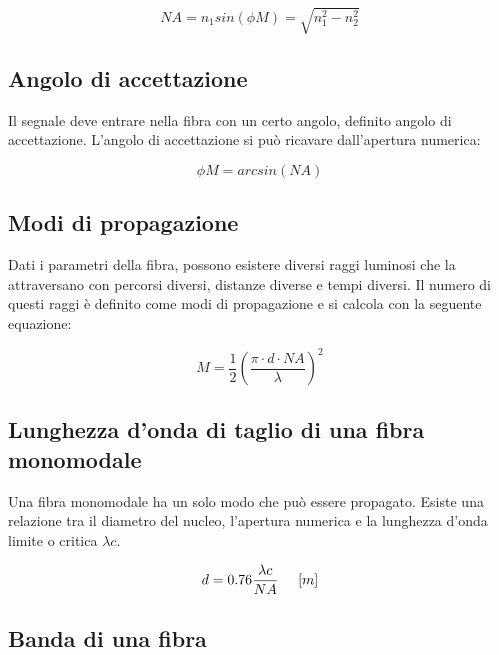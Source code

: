 \documentclass{article}
\begin{document}
    \begin{equation}
        NA = n_1 sin(\phi M) = \sqrt{n_1^2 - n_2^2}
    \end{equation}

    \subsection{Angolo di accettazione}

    Il segnale deve entrare nella fibra con un certo angolo, definito angolo di accettazione. L'angolo di accettazione si
    può ricavare dall'apertura numerica:

    \begin{equation}
        \phi M = arcsin(NA)
    \end{equation}

    \subsection{Modi di propagazione}

    Dati i parametri della fibra, possono esistere diversi raggi luminosi che la attraversano con percorsi diversi, distanze diverse
    e tempi diversi. Il numero di questi raggi è definito come modi di propagazione e si calcola con la seguente equazione:

    \begin{equation}
        M = \frac{1}{2} (\frac{\pi \cdot d \cdot NA}{\lambda})^2
    \end{equation}

    \subsection{Lunghezza d'onda di taglio di una fibra monomodale}

    Una fibra monomodale ha un solo modo che può essere propagato. Esiste una relazione tra il diametro del nucleo, l'apertura
    numerica e la lunghezza d'onda limite o critica $\lambda c$.

    \begin{equation}
        d = 0.76 \frac{\lambda c}{NA} \hspace{0.5cm} [m]
    \end{equation}

    \subsection{Banda di una fibra}
\end{document}
